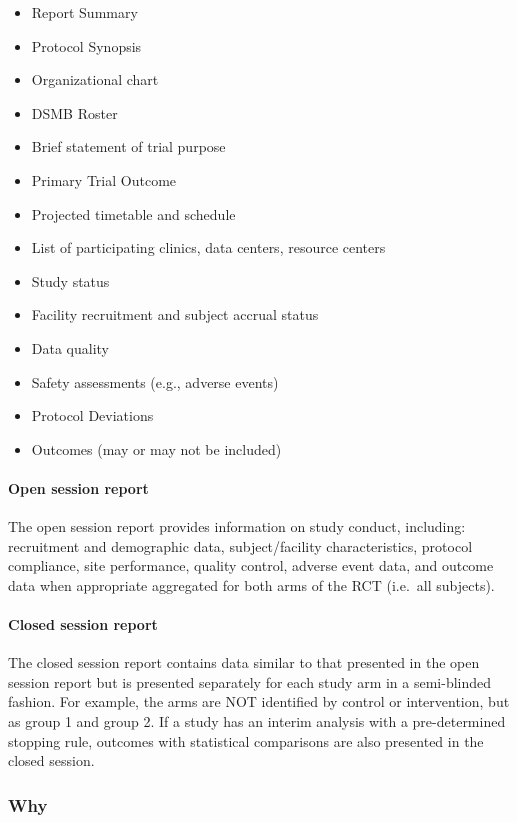 \documentclass[]{book}
\providecommand{\tightlist}{%
  \setlength{\itemsep}{0pt}\setlength{\parskip}{0pt}}
\theoremstyle{definition}
\theoremstyle{definition}
\theoremstyle{definition}
\theoremstyle{remark}
\begin{document}
\begin{itemize}
\tightlist
\item
  Report Summary
\item
  Protocol Synopsis
\item
  Organizational chart
\item
  DSMB Roster
\item
  Brief statement of trial purpose
\item
  Primary Trial Outcome
\item
  Projected timetable and schedule
\item
  List of participating clinics, data centers, resource centers
\item
  Study status
\item
  Facility recruitment and subject accrual status
\item
  Data quality
\item
  Safety assessments (e.g., adverse events)
\item
  Protocol Deviations
\item
  Outcomes (may or may not be included)
\end{itemize}

\paragraph{Open session report}\label{open-session-report}

The open session report provides information on study conduct,
including: recruitment and demographic data, subject/facility
characteristics, protocol compliance, site performance, quality control,
adverse event data, and outcome data when appropriate aggregated for
both arms of the RCT (i.e.~all subjects).

\paragraph{Closed session report}\label{closed-session-report}

The closed session report contains data similar to that presented in the
open session report but is presented separately for each study arm in a
semi-blinded fashion. For example, the arms are NOT identified by
control or intervention, but as group 1 and group 2. If a study has an
interim analysis with a pre-determined stopping rule, outcomes with
statistical comparisons are also presented in the closed session.

\subsubsection{Why}\label{why-15}
\end{document}
